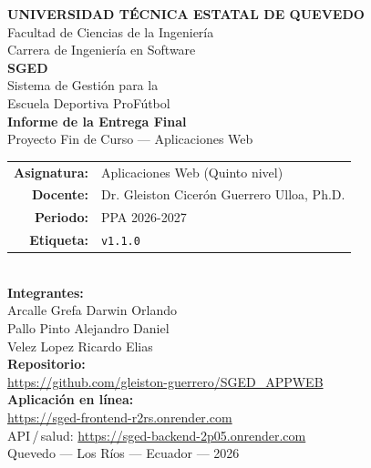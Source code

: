 \documentclass[11pt,a4paper]{article}
\begin{document}
\begin{center}
\vspace*{0.5cm}

{\LARGE\bfseries UNIVERSIDAD T\'ECNICA ESTATAL DE QUEVEDO}\\[0.4cm]
{\large Facultad de Ciencias de la Ingenier\'ia}\\[0.2cm]
{\large Carrera de Ingenier\'ia en Software}\\[2.2cm]

{\Huge\bfseries\color{uteqverde} SGED}\\[0.5cm]
{\Large Sistema de Gesti\'on para la\\Escuela Deportiva ProF\'utbol}\\[1cm]

{\LARGE\bfseries Informe de la Entrega Final}\\[0.4cm]
{\large Proyecto Fin de Curso --- Aplicaciones Web}\\[1.5cm]

{\large\begin{tabular}{rl}
\textbf{Asignatura:} & Aplicaciones Web (Quinto nivel) \\[0.15cm]
\textbf{Docente:} & Dr. Gleiston Cicer\'on Guerrero Ulloa, Ph.D. \\[0.15cm]
\textbf{Periodo:} & PPA 2026-2027 \\[0.15cm]
\textbf{Etiqueta:} & \texttt{v1.1.0} \\
\end{tabular}}\\[1.5cm]

{\large\bfseries Integrantes:}\\[0.4cm]
{\large Arcalle Grefa Darwin Orlando}\\
{\large Pallo Pinto Alejandro Daniel}\\
{\large Velez Lopez Ricardo Elias}\\[1cm]

{\large\bfseries Repositorio:}\\[0.25cm]
{\ttfamily\small\url{https://github.com/gleiston-guerrero/SGED_APPWEB}}\\[0.6cm]

{\large\bfseries Aplicaci\'on en l\'inea:}\\[0.25cm]
{\ttfamily\small\url{https://sged-frontend-r2rs.onrender.com}}\\[0.1cm]
{\ttfamily\small API\,/\,salud: \url{https://sged-backend-2p05.onrender.com}}\\[1cm]

{\large Quevedo --- Los R\'ios --- Ecuador --- 2026}

\vfill
\end{center}
\end{document}
